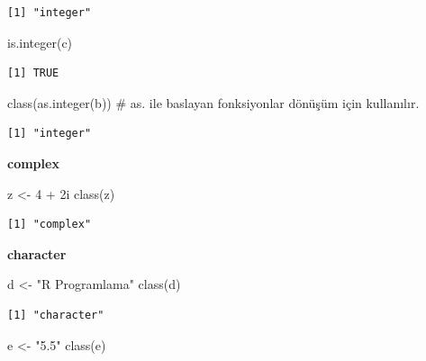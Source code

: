 \documentclass[
  letterpaper,
  DIV=11,
  numbers=noendperiod]{scrreprt}
\newenvironment{Shaded}{\begin{snugshade}}{\end{snugshade}}
\newcommand{\CommentTok}[1]{\textcolor[rgb]{0.37,0.37,0.37}{#1}}
\newcommand{\DecValTok}[1]{\textcolor[rgb]{0.68,0.00,0.00}{#1}}
\newcommand{\FunctionTok}[1]{\textcolor[rgb]{0.28,0.35,0.67}{#1}}
\newcommand{\NormalTok}[1]{\textcolor[rgb]{0.00,0.23,0.31}{#1}}
\newcommand{\OtherTok}[1]{\textcolor[rgb]{0.00,0.23,0.31}{#1}}
\newcommand{\SpecialCharTok}[1]{\textcolor[rgb]{0.37,0.37,0.37}{#1}}
\newcommand{\StringTok}[1]{\textcolor[rgb]{0.13,0.47,0.30}{#1}}
\begin{document}
\begin{verbatim}
[1] "integer"
\end{verbatim}

\begin{Shaded}
\begin{Highlighting}[]
\FunctionTok{is.integer}\NormalTok{(c)}
\end{Highlighting}
\end{Shaded}

\begin{verbatim}
[1] TRUE
\end{verbatim}

\begin{Shaded}
\begin{Highlighting}[]
\FunctionTok{class}\NormalTok{(}\FunctionTok{as.integer}\NormalTok{(b)) }\CommentTok{\# as. ile baslayan fonksiyonlar dönüşüm için kullanılır.}
\end{Highlighting}
\end{Shaded}

\begin{verbatim}
[1] "integer"
\end{verbatim}

\textbf{complex}

\begin{Shaded}
\begin{Highlighting}[]
\NormalTok{z }\OtherTok{\textless{}{-}} \DecValTok{4} \SpecialCharTok{+}\NormalTok{ 2i}
\FunctionTok{class}\NormalTok{(z)}
\end{Highlighting}
\end{Shaded}

\begin{verbatim}
[1] "complex"
\end{verbatim}

\textbf{character}

\begin{Shaded}
\begin{Highlighting}[]
\NormalTok{d }\OtherTok{\textless{}{-}} \StringTok{"R Programlama"}
\FunctionTok{class}\NormalTok{(d)}
\end{Highlighting}
\end{Shaded}

\begin{verbatim}
[1] "character"
\end{verbatim}

\begin{Shaded}
\begin{Highlighting}[]
\NormalTok{e }\OtherTok{\textless{}{-}} \StringTok{"5.5"}
\FunctionTok{class}\NormalTok{(e)}
\end{Highlighting}
\end{Shaded}
\end{document}

